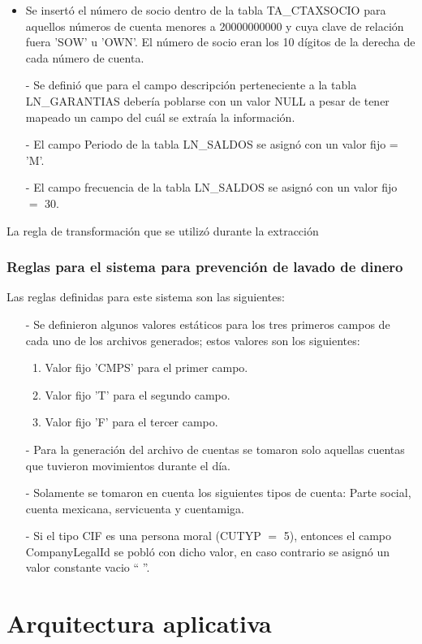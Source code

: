 \documentclass[a4paper,openright,12pt]{book}
\begin{document}
\begin{itemize}
\item Se insertó el número de socio dentro de la tabla TA\_CTAXSOCIO para aquellos números de cuenta menores a 20000000000 y cuya clave de relación fuera 'SOW' u 'OWN'. El número de socio eran los 10 dígitos de la derecha de cada número de cuenta.
\item[-] Se definió que para el campo descripción perteneciente a la tabla LN\_GARANTIAS debería poblarse con un valor NULL a pesar de tener mapeado un campo del cuál se extraía la información. 
\item[-] El campo Periodo de la tabla LN\_SALDOS se asignó con un valor fijo = 'M'.
\item[-] El campo frecuencia de la tabla LN\_SALDOS se asignó con un valor fijo $=$ 30. 
\end{itemize}
La regla de transformación que se utilizó durante la extracción 
\subsubsection{Reglas para el sistema para prevención de lavado de dinero}
Las reglas definidas para este sistema son las siguientes:
\begin{itemize}
\item[-] Se definieron algunos valores estáticos para los tres primeros campos de cada uno de los archivos generados; estos valores son los siguientes:
\begin{enumerate}
\item Valor fijo 'CMPS' para el primer campo.
\item Valor fijo 'T' para el segundo campo.
\item Valor fijo 'F' para el tercer campo.
\end{enumerate}
\item[-] Para la generación del archivo de cuentas se tomaron solo aquellas cuentas que tuvieron movimientos durante el día.
\item[-] Solamente se tomaron en cuenta los siguientes tipos de cuenta: Parte social, cuenta mexicana, servicuenta y cuentamiga.
\item[-] Si el tipo CIF es una persona moral (CUTYP $=$ 5), entonces el campo CompanyLegalId se pobló con dicho valor, en caso contrario se asignó un valor constante vacio `` ''.
 
\end{itemize}

\section{Arquitectura aplicativa}
\end{document}
